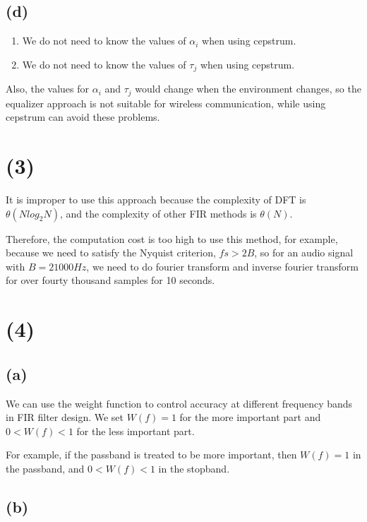 \documentclass{article}
\begin{document}
\subsection*{(d)}

\begin{enumerate}
    \item We do not need to know the values of $\alpha_i$ when using cepstrum.
    \item We do not need to know the values of $\tau_j$ when using cepstrum.
\end{enumerate}

Also, the values for $\alpha_i$ and $\tau_j$ would change when the environment changes, 
so the equalizer approach is not suitable for wireless communication, while using cepstrum can avoid these problems.

\section*{(3)}

It is improper to use this approach because the complexity of DFT is $\theta(N log_2 N)$,
and the complexity of other FIR methods is $\theta(N)$.  
\bigskip 

Therefore, the computation cost is too high to use this method, for example, 
because we need to satisfy the Nyquist criterion, $fs > 2B$, so for an audio signal with $B = 21000 Hz$, 
we need to do fourier transform and inverse fourier transform for over fourty thousand samples for 10 seconds.

\section*{(4)}

\subsection*{(a)}

We can use the weight function to control accuracy at different frequency bands in FIR filter design.  
We set $W(f) = 1$ for the more important part and $0 < W(f) < 1$ for the less important part.  
\bigskip

For example, if the passband is treated to be more important, 
then $W(f) = 1$ in the passband, and $0 < W(f) < 1$ in the stopband.


\subsection*{(b)}
\end{document}
